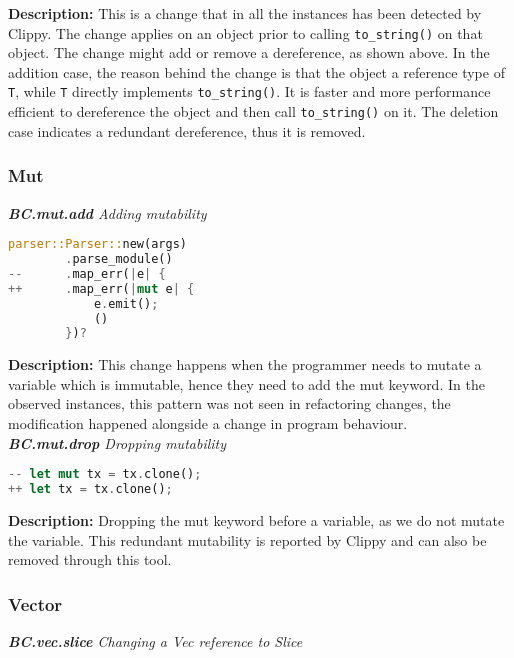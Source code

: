 \noindent \textbf{Description:} This is a change that in all the instances has been detected by Clippy. The change applies on an object prior to calling \verb+to_string()+ on that object. The change might add or remove a dereference, as shown above. In the addition case, the reason behind the change is that the object a reference type of \verb+T+, while \verb+T+ directly implements \verb+to_string()+. It is faster and more performance efficient to dereference the object and then call \verb+to_string()+ on it. The deletion case indicates a redundant dereference, thus it is removed.


\subsubsection{Mut}

\noindent \textit{ \textbf{BC.mut.add} Adding mutability}

\begin{lstlisting}[language=Rust, style=colouredRust]
parser::Parser::new(args)
        .parse_module()
--      .map_err(|e| {
++      .map_err(|mut e| {
            e.emit();
            ()
        })?
\end{lstlisting}

\noindent \textbf{Description:} This change happens when the programmer needs to mutate a variable which is immutable, hence they need to add the mut keyword. In the observed instances, this pattern was not seen in refactoring changes, the modification happened alongside a change in program behaviour. \\

\noindent \textit{ \textbf{BC.mut.drop} Dropping mutability}

\begin{lstlisting}[language=Rust, style=colouredRust]
-- let mut tx = tx.clone();
++ let tx = tx.clone();
\end{lstlisting}

\noindent \textbf{Description:} Dropping the mut keyword before a variable, as we do not mutate the variable. This redundant mutability is reported by Clippy and can also be removed through this tool.

\subsubsection{Vector}

\noindent \textit{ \textbf{BC.vec.slice} Changing a Vec reference to Slice}

